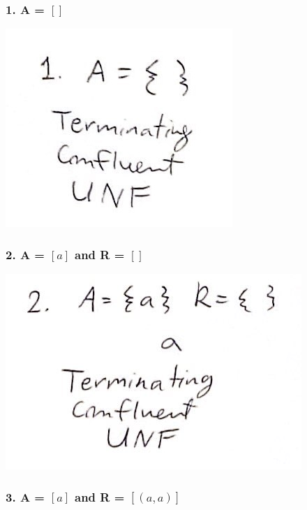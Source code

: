 \documentclass{article}
\theoremstyle{theorem}
\theoremstyle{definition}
\theoremstyle{remark}
\begin{document}
\subsubsection*{1. A = $\left[\right]$}

\begin{center}
  \includegraphics*[scale=0.3]{ars1.jpg}
  \end{center}

\subsubsection*{2. A = $\left[a\right]$ and R = $\left[\right]$}

  \begin{center}
    \includegraphics*[scale=0.3]{ars2.jpg}
    \end{center}

\subsubsection*{3. A = $\left[a\right]$ and R = $\left[(a,a)\right]$}
\end{document}
